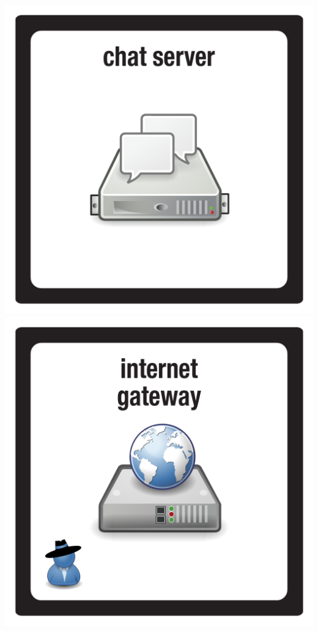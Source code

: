 \documentclass{letter}
\begin{document}
\includegraphics{tiles/node_chat_server}
\includegraphics{tiles/node_internet_gateway} \\
\end{document}
